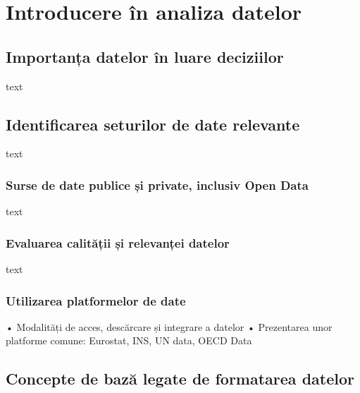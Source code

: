 \documentclass[
  11pt,
  b5paper,
  nottoc]{book}
\begin{document}

\hypertarget{cap1}{%
\chapter{Introducere în analiza datelor}\label{cap1}}

\hypertarget{importanux21ba-datelor-uxeen-luare-deciziilor}{%
\section{Importanța datelor în luare
deciziilor}\label{importanux21ba-datelor-uxeen-luare-deciziilor}}

text

\hypertarget{identificarea-seturilor-de-date-relevante}{%
\section{Identificarea seturilor de date
relevante}\label{identificarea-seturilor-de-date-relevante}}

text

\hypertarget{surse-de-date-publice-ux219i-private-inclusiv-open-data}{%
\subsection{Surse de date publice și private, inclusiv Open
Data}\label{surse-de-date-publice-ux219i-private-inclusiv-open-data}}

text

\hypertarget{evaluarea-calitux103ux21bii-ux219i-relevanux21bei-datelor}{%
\subsection{Evaluarea calității și relevanței
datelor}\label{evaluarea-calitux103ux21bii-ux219i-relevanux21bei-datelor}}

text

\hypertarget{utilizarea-platformelor-de-date}{%
\subsection{Utilizarea platformelor de
date}\label{utilizarea-platformelor-de-date}}

• Modalități de acces, descărcare și integrare a datelor • Prezentarea
unor platforme comune: Eurostat, INS, UN data, OECD Data

\hypertarget{concepte-de-bazux103-legate-de-formatarea-datelor}{%
\section{Concepte de bază legate de formatarea
datelor}\label{concepte-de-bazux103-legate-de-formatarea-datelor}}
\end{document}
